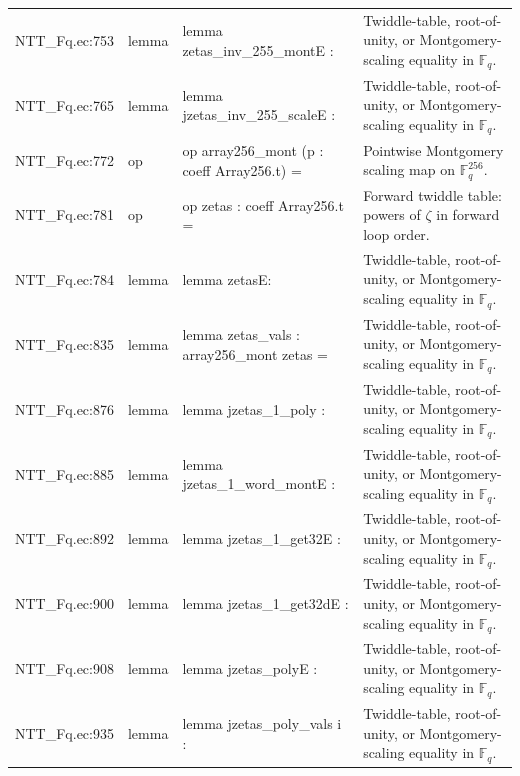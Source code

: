 \documentclass[10pt]{article}
\begin{document}
\begin{longtable}{L{0.11\textwidth}L{0.05\textwidth}L{0.38\textwidth}L{0.42\textwidth}}
NTT\_Fq.\allowbreak{}ec:\allowbreak{}753 & lemma & {\ttfamily\scriptsize lemma zetas\_inv\_255\_montE :} & Twiddle-table, root-of-unity, or Montgomery-scaling equality in $\mathbb F_q$. \\
NTT\_Fq.\allowbreak{}ec:\allowbreak{}765 & lemma & {\ttfamily\scriptsize lemma jzetas\_inv\_255\_scaleE :} & Twiddle-table, root-of-unity, or Montgomery-scaling equality in $\mathbb F_q$. \\
NTT\_Fq.\allowbreak{}ec:\allowbreak{}772 & op & {\ttfamily\scriptsize op array256\_mont (p : coeff Array256.t) =} & Pointwise Montgomery scaling map on $\mathbb F_q^{256}$. \\
NTT\_Fq.\allowbreak{}ec:\allowbreak{}781 & op & {\ttfamily\scriptsize op zetas : coeff Array256.t =} & Forward twiddle table: powers of $\zeta$ in forward loop order. \\
NTT\_Fq.\allowbreak{}ec:\allowbreak{}784 & lemma & {\ttfamily\scriptsize lemma zetasE:} & Twiddle-table, root-of-unity, or Montgomery-scaling equality in $\mathbb F_q$. \\
NTT\_Fq.\allowbreak{}ec:\allowbreak{}835 & lemma & {\ttfamily\scriptsize lemma zetas\_vals : array256\_mont zetas =} & Twiddle-table, root-of-unity, or Montgomery-scaling equality in $\mathbb F_q$. \\
NTT\_Fq.\allowbreak{}ec:\allowbreak{}876 & lemma & {\ttfamily\scriptsize lemma jzetas\_1\_poly :} & Twiddle-table, root-of-unity, or Montgomery-scaling equality in $\mathbb F_q$. \\
NTT\_Fq.\allowbreak{}ec:\allowbreak{}885 & lemma & {\ttfamily\scriptsize lemma jzetas\_1\_word\_montE :} & Twiddle-table, root-of-unity, or Montgomery-scaling equality in $\mathbb F_q$. \\
NTT\_Fq.\allowbreak{}ec:\allowbreak{}892 & lemma & {\ttfamily\scriptsize lemma jzetas\_1\_get32E :} & Twiddle-table, root-of-unity, or Montgomery-scaling equality in $\mathbb F_q$. \\
NTT\_Fq.\allowbreak{}ec:\allowbreak{}900 & lemma & {\ttfamily\scriptsize lemma jzetas\_1\_get32dE :} & Twiddle-table, root-of-unity, or Montgomery-scaling equality in $\mathbb F_q$. \\
NTT\_Fq.\allowbreak{}ec:\allowbreak{}908 & lemma & {\ttfamily\scriptsize lemma jzetas\_polyE :} & Twiddle-table, root-of-unity, or Montgomery-scaling equality in $\mathbb F_q$. \\
NTT\_Fq.\allowbreak{}ec:\allowbreak{}935 & lemma & {\ttfamily\scriptsize lemma jzetas\_poly\_vals i :} & Twiddle-table, root-of-unity, or Montgomery-scaling equality in $\mathbb F_q$. \\

\end{longtable}
\end{document}
